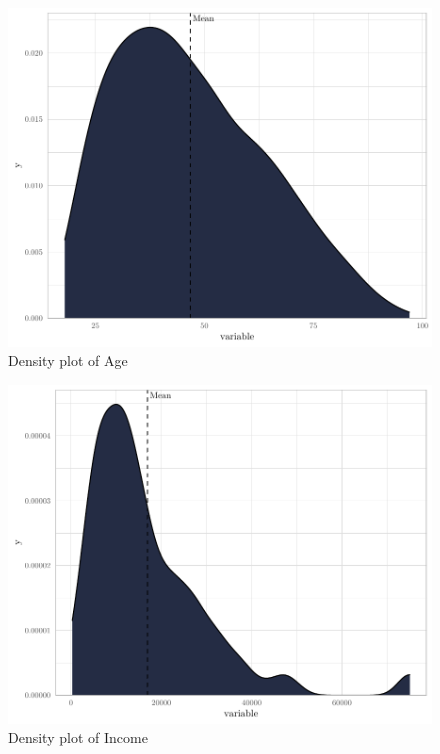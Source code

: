 \documentclass[
]{article}
\begin{document}
\begin{figure}[H]

{\centering \includegraphics[width=0.8\linewidth]{paper_files/figure-latex/unnamed-chunk-12-1} 

}

\caption{Density plot of Age}\label{fig:unnamed-chunk-12}
\end{figure}

\begin{figure}[H]

{\centering \includegraphics[width=0.8\linewidth]{paper_files/figure-latex/unnamed-chunk-13-1} 

}

\caption{Density plot of Income}\label{fig:unnamed-chunk-13}
\end{figure}
\end{document}
